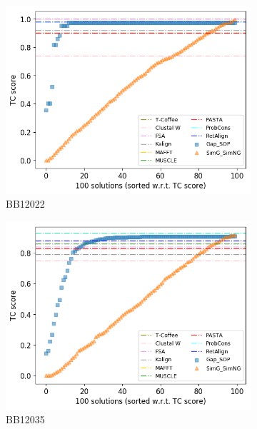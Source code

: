 \begin{figure}[!htbp]
\begin{adjustwidth}{-1cm}{-1cm}
		\begin{subfigure}{0.22\textwidth}
			\includegraphics[width=\columnwidth]{Figure/summary/precomputedInit/Balibase/BB12022_tc_density_single_run_2}
			\caption{BB12022}
		\end{subfigure}
		\begin{subfigure}{0.22\textwidth}
			\includegraphics[width=\columnwidth]{Figure/summary/precomputedInit/Balibase/BB12035_tc_density_single_run_2}
			\caption{BB12035}
		\end{subfigure}
		\begin{subfigure}{0.22\textwidth}

\end{subfigure}
\end{adjustwidth}
\end{figure}
